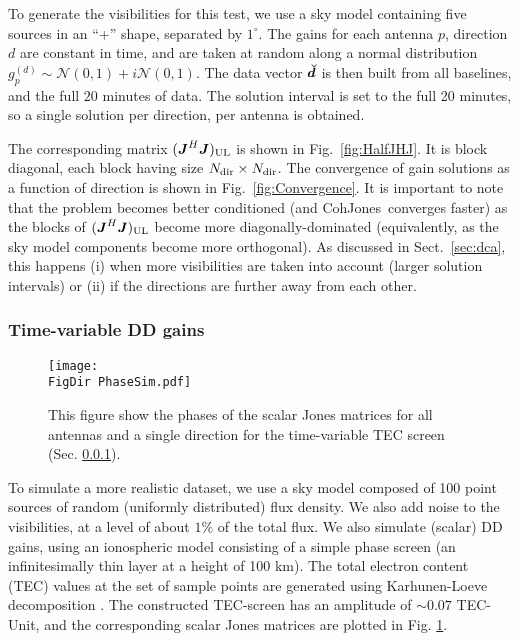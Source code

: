 \documentclass[useAMS,usenatbib]{mn2e}
\newcommand{\mat}[1]{{\bmath{#1}}}
\newcommand{\JJ}{\mat{J}} %
\newcommand{\JHJ}{\JJ^H\JJ} %
\newcommand{\AUG}[1]{\bmath{\breve{#1}}}
\newcommand{\Dd}{\AUG{d}}
\newcommand{\UL}{\mathrm{UL}}%
\newcommand{\FigDir}{../Figures/}
\newcommand{\COH}{{\sc CohJones}}
\begin{document}
To generate the visibilities for this test, we use a sky model containing five
sources in an ``+'' shape, separated by $1^\circ$. The gains
for each antenna $p$, direction $d$ are
constant in time, and are taken at random along a normal distribution
$g^{(d)}_{p}\sim\mathcal{N}\left(0,1\right)+i\mathcal{N}\left(0,1\right)$. The
data vector $\Dd$ is then built from all baselines, and the full $20$ minutes of data.
The solution interval is set to the full 20 minutes, so a single solution per direction, per antenna is 
obtained.

The corresponding matrix $(\JHJ)_\UL$ is shown in Fig.~\ref{fig:HalfJHJ}. It is block diagonal, each block having size
$N_\mathrm{dir}\times N_\mathrm{dir}$. The convergence of gain solutions as a function of direction is shown in Fig.~\ref{fig:Convergence}. 
It is important to note that the problem becomes better conditioned (and \COH\ converges faster) 
as the blocks of $(\JHJ)_\UL$ become more diagonally-dominated (equivalently, as the sky model components
become more orthogonal). As discussed in Sect.~\ref{sec:dca}, this happens (i) when more visibilities are taken into account (larger solution intervals) or (ii) if the directions are further away from each other.

\subsubsection{Time-variable DD gains}
\label{sec:VarSimul}

\begin{figure}
\begin{center}
\texttt{[image: \\FigDir PhaseSim.pdf]}
\caption{\label{fig:PhaseSim} This figure show the phases of the scalar Jones matrices for all antennas and a single direction for the time-variable TEC screen (Sec. \ref{sec:VarSimul}).}
\end{center}
\end{figure}

To simulate a more realistic dataset, we use a sky model composed of 100 point sources of random (uniformly distributed) flux density. We also add noise to the visibilities, at a level of about $1\%$ of the total flux. We also simulate
(scalar) DD gains, using an ionospheric model consisting of a simple phase screen (an infinitesimally thin layer at a height of 100 km). The total electron content (TEC) values at the set of sample points are generated using Karhunen-Loeve decomposition \citep[the spatial correlation is given by Kolmogorov turbulence, see][]{Tol09}. The constructed TEC-screen has an amplitude of $\sim0.07$ TEC-Unit, and the corresponding scalar Jones matrices are plotted in Fig. \ref{fig:PhaseSim}.
\end{document}
